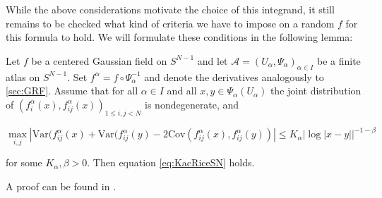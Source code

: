 While the above considerations motivate the choice of this integrand, it still remains to be checked what kind of criteria we have to impose on a random $f$ for this formula to hold. We will formulate these conditions in the following lemma:

\begin{theorem}\label{thm:KacRice}
	Let $f$ be a centered Gaussian field on $S^{N-1}$ and let $\mathcal A=(U_\alpha,\Psi_\alpha)_{\alpha\in I}$ be a finite atlas on $S^{N-1}$. Set $f^\alpha = f\circ\Psi^{-1}_\alpha$ and denote the derivatives analogously to \ref{sec:GRF}. Assume that for all $\alpha\in I$ and all $x,y\in \Psi_\alpha(U_\alpha)$ the joint distribution of $(f_i^\alpha(x),f_{ij}^\alpha(x))_{1\leq i,j<N}$ is nondegenerate, and 
	
	$$\max_{i,j}|\text{Var}(f_{ij}^\alpha(x)+\text{Var}(f_{ij}^\alpha(y)-2\text{Cov}(f_{ij}^\alpha(x),f_{ij}^\alpha(y))|\leq K_\alpha|\log|x-y||^{-1-\beta}$$
	
	for some $K_\alpha,\beta>0$. Then equation \ref{eq:KacRiceSN} holds.
\end{theorem}

A proof can be found in \cite{Adler07}.








